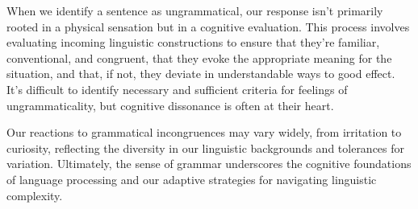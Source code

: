 


When we identify a sentence as ungrammatical, our response isn't primarily rooted in a physical sensation but in a cognitive evaluation. This process involves evaluating incoming linguistic constructions to ensure that they're familiar, conventional, and congruent, that they evoke the appropriate meaning for the situation, and that, if not, they deviate in understandable ways to good effect. It's difficult to identify necessary and sufficient criteria for feelings of ungrammaticality, but cognitive dissonance is often at their heart.


Our reactions to grammatical incongruences may vary widely, from irritation to curiosity, reflecting the diversity in our linguistic backgrounds and tolerances for variation. Ultimately, the sense of grammar underscores the cognitive foundations of language processing and our adaptive strategies for navigating linguistic complexity.

